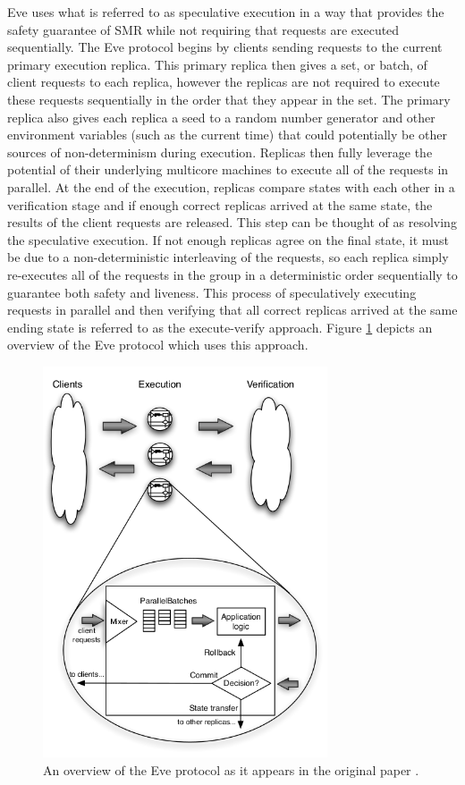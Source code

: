 \documentclass[11pt, oneside]{report}
\begin{document}
Eve uses what is referred to as speculative execution \cite{eve, zyz} in a way that provides the safety guarantee of SMR while not requiring that requests are executed sequentially. 
The Eve protocol begins by clients sending requests to the current primary execution replica.
This primary replica then gives a set, or batch, of client requests to each replica, however the replicas are not required to execute these requests sequentially in the order that they appear in the set. 
The primary replica also gives each replica a seed to a random number generator and other environment variables (such as the current time) that could potentially be other sources of non-determinism during execution.
Replicas then fully leverage the potential of their underlying multicore machines to execute all of the requests in parallel. 
At the end of the execution, replicas compare states with each other in a verification stage and if enough correct replicas arrived at the same state, the results of the client requests are released. 
This step can be thought of as resolving the speculative execution. 
If not enough replicas agree on the final state, it must be due to a non-deterministic interleaving of the requests, so each replica simply re-executes all of the requests in the group in a deterministic order sequentially to guarantee both safety and liveness. 
This process of speculatively executing requests in parallel and then verifying that all correct replicas arrived at the same ending state is referred to as the execute-verify approach. Figure \ref{eveDiagram} depicts an overview of the Eve protocol which uses this approach.

\begin{figure}[h]
\centering
\includegraphics[width=0.75\textwidth]{eveOverview.png}
\caption{\label{eveDiagram} An overview of the Eve protocol as it appears in the original paper \protect\cite{eve}.}
\end{figure}
\end{document}
